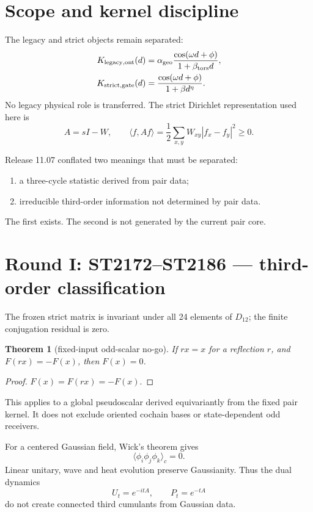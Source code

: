 \documentclass[11pt,a4paper]{article}
\newtheorem{theorem}{Theorem}
\begin{document}
\tableofcontents\newpage

\section{Scope and kernel discipline}

The legacy and strict objects remain separated:
\[
\begin{aligned}
K_{\rm legacy,ont}(d)
 &=\alpha_{\rm geo}\frac{\cos(\omega d+\phi)}{1+\beta_{\rm tors}d},\\
K_{\rm strict,gate}(d)
 &=\frac{\cos(\omega d+\phi)}{1+\beta d^\eta}.
\end{aligned}
\]
No legacy physical role is transferred.  The strict Dirichlet representation
used here is
\[
 A=sI-W,\qquad
 \langle f,Af\rangle
 =\frac12\sum_{x,y}W_{xy}|f_x-f_y|^2\geq0.
\]

Release 11.07 conflated two meanings that must be separated:
\begin{enumerate}[label=(\roman*)]
\item a three-cycle statistic derived from pair data;
\item irreducible third-order information not determined by pair data.
\end{enumerate}
The first exists.  The second is not generated by the current pair core.

\section{Round I: ST2172--ST2186 --- third-order classification}

The frozen strict matrix is invariant under all 24 elements of \(D_{12}\);
the finite conjugation residual is zero.

\begin{theorem}[fixed-input odd-scalar no-go]
If \(rx=x\) for a reflection \(r\), and \(F(rx)=-F(x)\), then \(F(x)=0\).
\end{theorem}
\begin{proof}
\(F(x)=F(rx)=-F(x)\).
\end{proof}

This applies to a global pseudoscalar derived equivariantly from the fixed pair
kernel.  It does not exclude oriented cochain bases or state-dependent odd
receivers.

For a centered Gaussian field, Wick's theorem gives
\[
 \langle\phi_i\phi_j\phi_k\rangle_c=0.
\]
Linear unitary, wave and heat evolution preserve Gaussianity.  Thus the dual
dynamics
\[
 U_t=e^{-itA},\qquad P_t=e^{-tA}
\]
do not create connected third cumulants from Gaussian data.
\end{document}
